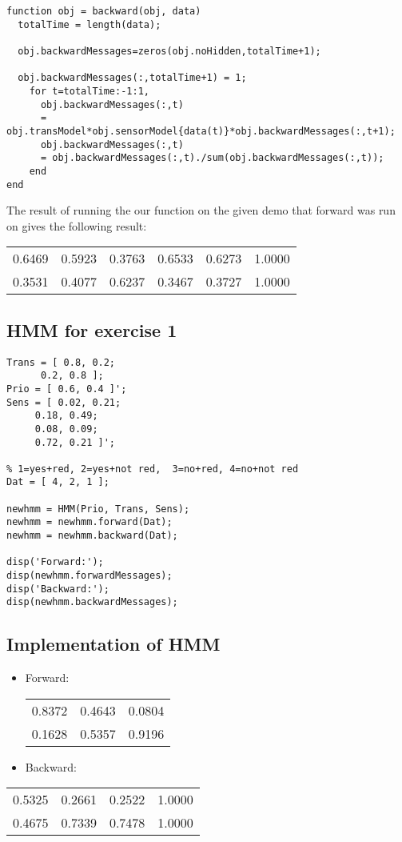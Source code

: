 \documentclass[colorlinks=true,linkcolor=blue]{article}
\begin{document}
\begin{verbatim}
function obj = backward(obj, data)
  totalTime = length(data);

  obj.backwardMessages=zeros(obj.noHidden,totalTime+1);           

  obj.backwardMessages(:,totalTime+1) = 1;
    for t=totalTime:-1:1,
      obj.backwardMessages(:,t) 
      = obj.transModel*obj.sensorModel{data(t)}*obj.backwardMessages(:,t+1);
      obj.backwardMessages(:,t) 
      = obj.backwardMessages(:,t)./sum(obj.backwardMessages(:,t));
    end
end
\end{verbatim}

The result of running the our function on the given demo that forward was run on gives the following result:

\begin{center}
\begin{tabular}{rrrrrr}
0.6469 & 0.5923 & 0.3763 & 0.6533 & 0.6273 & 1.0000\\
0.3531 & 0.4077 & 0.6237 & 0.3467 & 0.3727 & 1.0000\\
\end{tabular}
\end{center}

\subsection{HMM for exercise 1}
\label{sec-2-2}
\begin{verbatim}
Trans = [ 0.8, 0.2; 
	  0.2, 0.8 ];
Prio = [ 0.6, 0.4 ]';
Sens = [ 0.02, 0.21; 
	 0.18, 0.49; 
	 0.08, 0.09; 
	 0.72, 0.21 ]';

% 1=yes+red, 2=yes+not red,  3=no+red, 4=no+not red
Dat = [ 4, 2, 1 ];

newhmm = HMM(Prio, Trans, Sens);
newhmm = newhmm.forward(Dat);
newhmm = newhmm.backward(Dat);

disp('Forward:');
disp(newhmm.forwardMessages);
disp('Backward:');
disp(newhmm.backwardMessages);
\end{verbatim}

\subsection{Implementation of HMM}
\label{sec-2-3}
\begin{itemize}
\item Forward:
\begin{center}
\begin{tabular}{rrr}
0.8372 & 0.4643 & 0.0804\\
0.1628 & 0.5357 & 0.9196\\
\end{tabular}
\end{center}

\item Backward:
\end{itemize}
\begin{center}
\begin{tabular}{rrrr}
0.5325 & 0.2661 & 0.2522 & 1.0000\\
0.4675 & 0.7339 & 0.7478 & 1.0000\\
\end{tabular}
\end{center}
\end{document}
